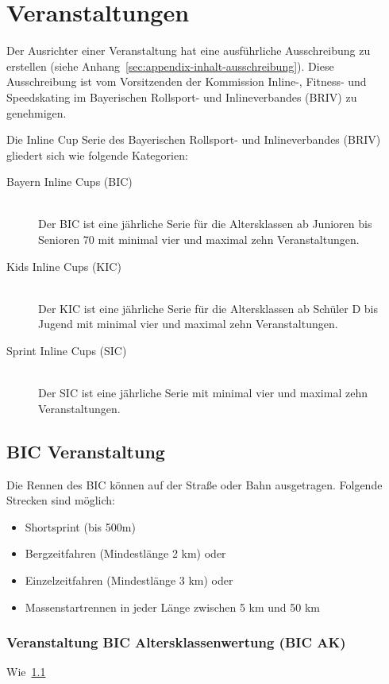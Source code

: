 \section{Veranstaltungen}
Der Ausrichter einer Veranstaltung hat eine ausführliche Ausschreibung zu erstellen (siehe Anhang~\ref{sec:appendix-inhalt-ausschreibung}). Diese Ausschreibung ist vom Vorsitzenden der Kommission Inline-, Fitness- und Speedskating im Bayerischen Rollsport- und Inlineverbandes (BRIV) zu genehmigen.

Die Inline Cup Serie des Bayerischen Rollsport- und Inlineverbandes (BRIV) gliedert sich wie folgende Kategorien:

\begin{description}
	\item[Bayern Inline Cups (BIC)] \hfill \\
	Der BIC ist eine jährliche Serie für die Altersklassen ab Junioren bis Senioren 70 mit minimal vier und maximal zehn Veranstaltungen.
	\item[Kids Inline Cups (KIC)] \hfill \\
	Der KIC ist eine jährliche Serie für die Altersklassen ab Schüler D bis Jugend mit minimal vier und maximal zehn Veranstaltungen.
	\item[Sprint Inline Cups (SIC)] \hfill \\
	Der SIC ist eine jährliche Serie mit minimal vier und maximal zehn Veranstaltungen.
\end{description}

\subsection{BIC Veranstaltung}
\label{subsec:bic-veranstaltung}
Die Rennen des BIC können auf der Straße oder Bahn ausgetragen. Folgende Strecken sind möglich:
\begin{itemize}
	\item Shortsprint (bis 500m)
	\item Bergzeitfahren (Mindestlänge 2 km) oder
	\item Einzelzeitfahren (Mindestlänge 3 km) oder
	\item Massenstartrennen in jeder Länge zwischen 5 km und 50 km
\end{itemize}

\subsubsection{Veranstaltung BIC Altersklassenwertung (BIC AK)}
Wie~\ref{subsec:bic-veranstaltung}

